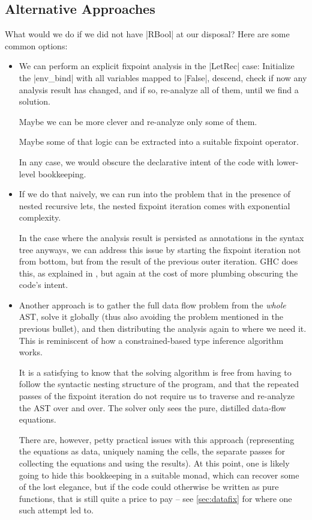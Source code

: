 \documentclass[manuscript,screen,acmsmall,nonacm]{acmart}
\begin{document}

\subsection{Alternative Approaches}\label{sec:casestudyalts}
What would we do if we did not have |RBool| at our disposal? Here are some common options:
\begin{itemize}
\item We can perform an explicit fixpoint analysis in the |LetRec| case: Initialize the |env_bind| with all variables mapped to |False|, descend, check if now any analysis result has changed, and if so, re-analyze all of them, until we find a solution.

Maybe we can be more clever and re-analyze only some of them.

Maybe some of that logic can be extracted into a suitable fixpoint operator.

In any case, we would obscure the declarative intent of the code with lower-level bookkeeping.

\item If we do that naively, we can run into the problem that in the presence of nested recursive lets, the nested fixpoint iteration comes with exponential complexity.

In the case where the analysis result is persisted as annotations in the syntax tree anyways, we can address this issue by starting the fixpoint iteration not from bottom, but from the result of the previous outer iteration.
%
GHC does this, as explained in \citet[Section 6.6]{modular}, but again at the cost of more plumbing obscuring the code's intent.

\item Another approach is to gather the full data flow problem from the \emph{whole} AST, solve it globally (thus also avoiding the problem mentioned in the previous bullet), and then distributing the analysis again to where we need it. This is reminiscent of how a constrained-based type inference algorithm works.

It is a satisfying to know that the solving algorithm is free from having to follow the syntactic nesting structure of the program, and that the repeated passes of the fixpoint iteration do not require us to traverse and re-analyze the AST over and over. The solver only sees the pure, distilled data-flow equations.

There are, however, petty practical issues with this approach (representing the equations as data, uniquely naming the cells, the separate passes for collecting the equations and using the results).
At this point, one is likely going to hide this bookkeeping in a suitable monad, which can recover some of the lost elegance, but if the code could otherwise be written as pure functions, that is still quite a price to pay -- see \cref{sec:datafix} for where one such attempt led to.
\end{itemize}
\end{document}
